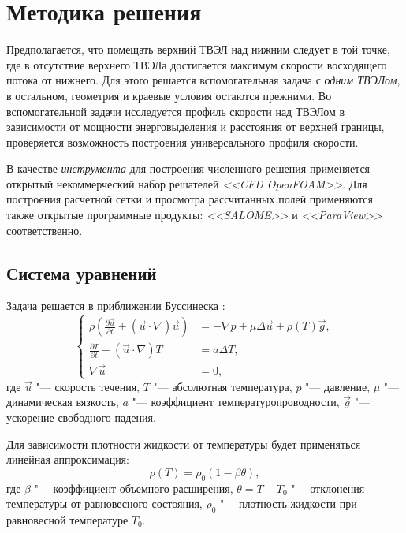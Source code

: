 \section{Методика решения}
Предполагается, что помещать верхний ТВЭЛ над нижним следует в той точке, где в отсутствие верхнего ТВЭЛа достигается максимум скорости восходящего потока от нижнего. Для этого решается вспомогательная задача с \emph{одним ТВЭЛом}, в остальном, геометрия и краевые условия остаются прежними. Во вспомогательной задачи исследуется профиль скорости над ТВЭЛом в зависимости от мощности энерговыделения и расстояния от верхней границы, проверяется возможность построения универсального профиля скорости.

В качестве \emph{инструмента} для построения численного решения применяется открытый некоммерческий набор решателей \emph{<<CFD OpenFOAM>>}. Для построения расчетной сетки и просмотра рассчитанных полей применяются также открытые программные продукты: \emph{<<SALOME>>} и \emph{<<ParaView>>} соответственно.

\subsection{Система уравнений}

Задача решается в приближении Буссинеска \cite{loiz}:
\begin{equation} \label{eq:bouss}
\left\{
\begin{aligned}
	\rho \left(\frac{\partial \vec{u}}{\partial t} + (\vec{u}\cdot \nabla)\vec{u}\right) &= -\nabla p + \mu \Delta \vec{u} + \rho(T) \vec{g},\\
	\frac{\partial T}{\partial t} + (\vec{u} \cdot \nabla) T &= a \Delta T, \\
	\nabla \vec{u} &= 0,
\end{aligned}
\right.
\end{equation}
где $\vec{u}$ "--- скорость течения, $T$ "--- абсолютная температура, $p$ "--- давление, $\mu$ "--- динамическая вязкость, $a$ "--- коэффициент температуропроводности, $\vec{g}$ "--- ускорение свободного падения.

Для зависимости плотности жидкости от температуры будет применяться линейная аппроксимация:
\begin{equation}
	\rho (T) = \rho_0 (1-\beta \theta), \label{eq:rho}
\end{equation}
где $\beta$ "--- коэффициент объемного расширения, $\theta = T - T_0$ "--- отклонения температуры от равновесного состояния, $\rho_0$ "--- плотность жидкости при равновесной температуре $T_0$.

